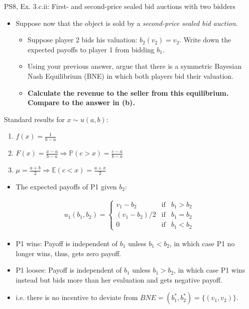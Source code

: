\begin{frame}{PS8, Ex. 3.c.ii: First- and second-price sealed bid auctions with two bidders}
    \begin{multicols}{2}
      \begin{itemize}
        \item[(c)] Suppose now that the object is sold by a \textit{second-price sealed bid auction}.
        \begin{itemize}\normalsize
          \item[i.]   Suppose player 2 bids his valuation: $b_2(v_2) = v_2$. Write down the expected payoffs to player 1 from bidding $b_1$.
          \item[ii.]  Using your previous answer, argue that there is a symmetric Bayesian Nash Equilibrium (BNE) in which both players bid their valuation.
          \item[iii.] \textbf{Calculate the revenue to the seller from this equilibrium. Compare to the answer in (b).}
        \end{itemize}
      \end{itemize}
      Standard results for $x\sim u(a, b):$
      \vspace{-6pt}
      \begin{enumerate}
        \item[PDF:] $f(x)=\frac{1}{b-a}$
        \item[CDF:] $F(x)=\frac{x-a}{b-a}\Rightarrow\mathbb{P}(c>x)=\frac{c-a}{b-a}$
        \item[Mean:] $\mu=\frac{a+b}{2}\Rightarrow\mathbb{E}(c<x)=\frac{a+x}{2}$
      \end{enumerate}
      \vfill\null\columnbreak
      \begin{itemize}
        \item[(i)] The expected payoffs of P1 given $b_2$:
      \end{itemize}
      \vspace{-12pt}
      \begin{align*}
        u_1(b_1,b_2)=\left\{\begin{array}{lcl}
          v_1-b_2     & \text{if} & b_1>b_2 \\
          (v_1-b_2)/2 & \text{if} & b_1=b_2 \\
          0           & \text{if} & b_1<b_2
        \end{array}\right.
      \end{align*}
      \vspace{-18pt}
      \begin{itemize}
        \item[(ii)] P1 wins: Payoff is independent of $b_1$ unless $b_1<b_2$, in which case P1 no longer wins, thus, gets zero payoff.
        \item[] P1 looses: Payoff is independent of $b_1$ unless $b_1>b_2$, in which case P1 wins instead but bids more than her evaluation and gets negative payoff.
        \item[] i.e. there is no incentive to deviate from $BNE=(b_1^*,b_2^*)=\{(v_1,v_2)\}$.
      \end{itemize}
      \vfill\null
    \end{multicols}
\end{frame}


